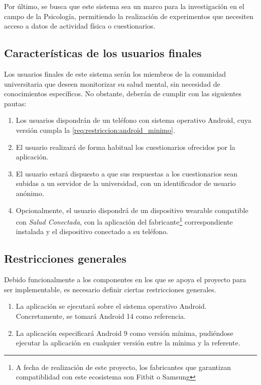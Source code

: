         Por último, se busca que este sistema sea un marco para la investigación en el campo de la Psicología, permitiendo la realización de experimentos que necesiten acceso a datos de actividad física o cuestionarios.


    \subsection{Características de los usuarios finales}
        \label{req:descripcion:usuarios}
        
        Los usuarios finales de este sistema serán los miembros de la comunidad universitaria que deseen monitorizar su salud mental, sin necesidad de conocimientos específicos. No obstante, deberán de cumplir con las siguientes pautas:
    
        \begin{enumerate}
            \item Los usuarios dispondrán de un teléfono con sistema operativo Android, cuya versión cumpla la \ref{req:restriccion:android_minimo}.
            \item El usuario realizará de forma habitual los cuestionarios ofrecidos por la aplicación.
            \item El usuario estará dispuesto a que sus respuestas a los cuestionarios sean subidas a un servidor de la universidad, con un identificador de usuario anónimo.
            \item Opcionalmente, el usuario dispondrá de un dispositivo \gls{wearable} compatible con \textit{Salud Conectada}, con la aplicación del fabricante\footnote{A fecha de realización de este proyecto, los fabricantes que garantizan compatiblidad con este ecosistema son Fitbit o Samsung} correspondiente instalada y el dispositivo conectado a su teléfono.
            
        \end{enumerate}
        
    \subsection{Restricciones generales}
        \label{req:descripcion:restricciones}
        Debido funcionalmente a los componentes en los que se apoya el proyecto para ser implementable, es necesario definir ciertas restricciones generales.
        \begin{enumerate}[label=\textbf{RG-\arabic*}]
            \item \label{req:restriccion:android_referencia} La aplicación se ejecutará sobre el sistema operativo Android. Concretamente, se tomará Android 14 como referencia.
            \item \label{req:restriccion:android_minimo} La aplicación especificará Android 9 como versión mínima, pudiéndose ejecutar la aplicación en cualquier versión entre la mínima y la referente.
        \end{enumerate}
    
